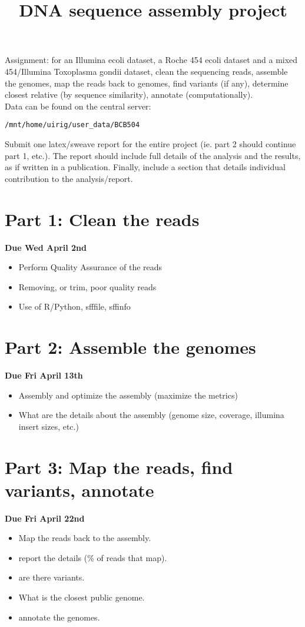 \documentclass{article}
\begin{document}
\title{DNA sequence assembly project}

\maketitle

Assignment: for an Illumina ecoli dataset, a Roche 454 ecoli dataset and a mixed 454/Illumina Toxoplasma gondii dataset, clean the sequencing reads, assemble the genomes, map the reads back to genomes, find variants (if any), determine closest relative (by sequence similarity), annotate (computationally).\\
Data can be found on the central server:
\begin{verbatim}
/mnt/home/uirig/user_data/BCB504
\end{verbatim}

Submit one latex/sweave report for the entire project (ie. part 2 should continue part 1, etc.). The report should include full details of the analysis and the results, as if written in a publication. Finally, include a section that details individual contribution to the analysis/report. 


\section*{Part 1: Clean the reads}
\textbf{Due Wed April 2nd}\\
\begin{itemize}
\item Perform Quality Assurance of the reads
\item Removing, or trim, poor quality reads
\item Use of R/Python, sfffile, sffinfo
\end{itemize}

\section*{Part 2: Assemble the genomes}
\textbf{Due Fri April 13th}\\
\begin{itemize}
\item Assembly and optimize the assembly (maximize the metrics)
\item What are the details about the assembly (genome size, coverage, illumina insert sizes, etc.)
\end{itemize}

\section*{Part 3: Map the reads, find variants, annotate}
\textbf{Due Fri April 22nd}\\
\begin{itemize}
\item Map the reads back to the assembly.
\item report the details (\% of reads that map).
\item are there variants.
\item What is the closest public genome.
\item annotate the genomes. 
\end{itemize}
\end{document}
